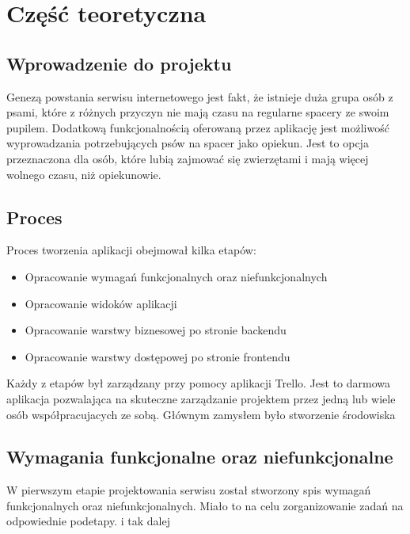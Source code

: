 \chapter{Część teoretyczna}
\section{Wprowadzenie do projektu}
Genezą powstania serwisu internetowego jest fakt, że istnieje duża grupa osób z psami, które z różnych przyczyn nie mają czasu na regularne spacery ze swoim pupilem. Dodatkową funkcjonalnością oferowaną przez aplikację jest możliwość wyprowadzania potrzebujących psów na spacer jako opiekun. Jest to opcja przeznaczona dla osób, które lubią zajmować się zwierzętami i mają więcej wolnego czasu, niż opiekunowie.

\section{Proces}
Proces tworzenia aplikacji obejmował kilka etapów:
\begin{itemize}
    \item Opracowanie wymagań funkcjonalnych oraz niefunkcjonalnych
    \item Opracowanie widoków aplikacji
    \item Opracowanie warstwy biznesowej po stronie backendu
    \item Opracowanie warstwy dostępowej po stronie frontendu
\end{itemize}

Każdy z etapów był zarządzany przy pomocy aplikacji Trello. Jest to darmowa aplikacja pozwalająca na skuteczne zarządzanie projektem przez jedną lub wiele osób współpracujacych ze sobą. Głównym zamysłem było stworzenie środowiska
\section{Wymagania funkcjonalne oraz niefunkcjonalne}
W pierwszym etapie projektowania serwisu został stworzony spis wymagań funkcjonalnych oraz niefunkcjonalnych. Miało to na celu zorganizowanie zadań na odpowiednie podetapy. i tak dalej
